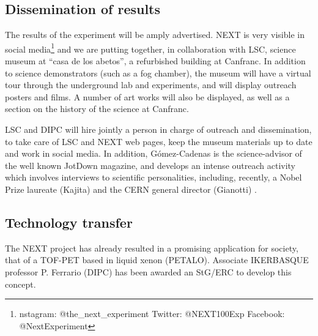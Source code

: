
\subsection{Dissemination of results}

\indent
The results of the experiment will be amply advertised. NEXT is very visible in social media\footnote{nstagram: @the\_next\_experiment
Twitter: @NEXT100Exp
Facebook: @NextExperiment} and we are putting together, in collaboration with LSC, science museum at ``casa de los abetos'', a refurbished building at Canfranc. In addition to science demonstrators (such as a fog chamber), the museum will have a virtual tour through the underground lab and experiments, and will display outreach posters and films. A number of art works will also be displayed, as well as a section on the history of the science at Canfranc. 

\indent

LSC and DIPC will hire jointly a person in charge of outreach and dissemination, to take care of LSC and NEXT web pages, keep the museum materials up to date and work in social media. In addition, G\'omez-Cadenas
is the science-advisor of the well known JotDown magazine, and develops an intense outreach activity which involves interviews to scientific personalities, including, recently, a Nobel Prize laureate (Kajita) and the CERN general director (Gianotti) .

\subsection{Technology transfer}
The NEXT project has already resulted in a promising application for society, that of a TOF-PET based in liquid xenon (PETALO). Associate IKERBASQUE professor P. Ferrario (DIPC) has been awarded an StG/ERC to develop this concept.


